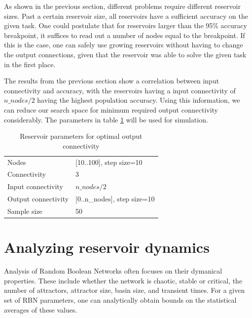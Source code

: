 As shown in the previous section, different problems require different reservoir sizes.
Past a certain reservoir size, all reservoirs have a sufficient accuracy on the given task.
One could postulate that for reservoirs larger than the 95\% accuracy breakpoint,
it suffices to read out a number of nodes equal to the breakpoint.
If this is the case, one can safely use growing reservoirs without having to change the output connections,
given that the reservoir was able to solve the given task in the first place.

The results from the previous section show a correlation between input connectivity and accuracy,
with the reservoirs having a input connectivity of $n\_nodes / 2$ having the highest population accuracy.
Using this information, we can reduce our search space for minimum required output connectivity considerably.
The parameters in table \ref{tab:oc-reservoir-parameters} will be used for simulation.

\begin{table}[ht]
    \centering
    \caption{Reservoir parameters for optimal output connectivity}
    \label{tab:oc-reservoir-parameters}
    \begin{tabular}{ll}
        Nodes               & [10..100], step size=10           \\
        Connectivity        & 3                                 \\
        Input connectivity  & $ n\_nodes / 2 $                  \\
        Output connectivity & [0..n\_nodes], step size=10       \\
        Sample size         & 50
    \end{tabular}
\end{table}

\section{Analyzing reservoir dynamics}

Analysis of Random Boolean Networks often focuses on their dymanical properties.
These include whether the network is chaotic, stable or critical,
the number of attractors, attractor size, basin size, and transient times.
For a given set of RBN parameters, one can analytically obtain bounds on the statistical averages of these values.

